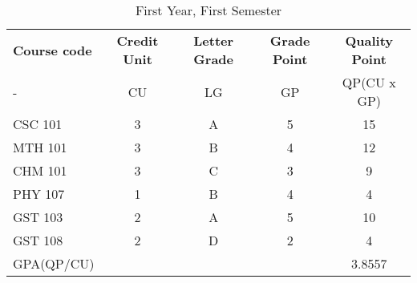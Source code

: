 \documentclass{article}
\begin{document}
	\begin{table}
		\caption{First Year, First Semester}
		\label{tab: 1.1 }
		\begin{tabular}{|l| c | c | c |c|}
			\rowcolor{red!10}\textbf{Course code} & \textbf{Credit Unit} & \textbf{Letter Grade} & 
			\textbf{Grade Point} & \textbf{Quality Point}\\
			\cellcolor{blue!10}-& \cellcolor{blue!15} CU & \cellcolor{blue!10} LG & \cellcolor{blue!15} GP &\cellcolor{blue!15} QP(CU x GP)\\
			\hline
			\cellcolor{blue!20} CSC 101 & 3 & A & 5 & 15\\
			\cellcolor{blue!10} MTH 101 & 3 & B & 4 & 12\\
			\cellcolor{blue!20} CHM 101 & 3 & C & 3 & 9\\
			\cellcolor{blue!10} PHY 107 & 1 & B & 4 & 4\\
			\cellcolor{blue!20} GST 103 & 2 & A & 5 & 10\\
			\cellcolor{blue!10} GST 108 & 2 & D & 2 & 4\\
			\rowcolor{yellow!20}GPA(QP/CU) & & & & 3.8557\\
			\hline
			
		\end{tabular}
	\end{table}
	
\end{document}
